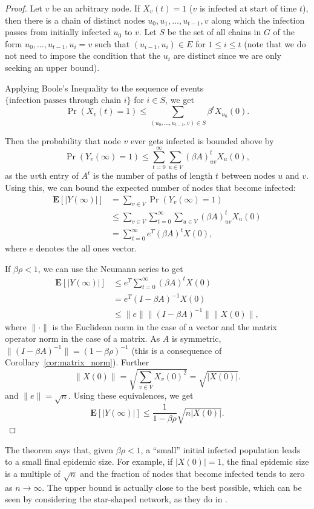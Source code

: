 \documentclass[11pt]{article}
\begin{document}
\begin{proof}
Let $v$ be an arbitrary node. If $X_v(t)=1$ ($v$ is infected at start of time $t$), then there is a chain of distinct nodes $u_0,u_1,\ldots,u_{t-1},v$ along which the infection passes from initially infected $u_0$ to $v$. Let $S$ be the set of all chains in $G$ of the form $u_0, \ldots, u_{t-1},u_i=v$ such that $(u_{i-1},u_i)\in E$ for $1\leq i\leq t$ (note that we do not need to impose the condition that the $u_i$ are distinct since we are only seeking an upper bound).

Applying Boole's Inequality to the sequence of events $\{\text{infection passes through chain } i\}$ for $i\in S$, we get
$$\Pr(X_v(t) = 1) \leq \sum_{(u_0,\ldots,u_{t-1},v)\in S} \beta^t X_{u_0}(0).$$

Then the probability that node $v$ ever gets infected is bounded above by
$$\Pr(Y_v(\infty) = 1) \leq \sum_{t=0}^\infty \sum_{u\in V} (\beta A)^t_{uv} X_u(0),$$
as the $uv$th entry of $A^t$ is the number of paths of length $t$ between nodes $u$ and $v$. Using this, we can bound the expected number of nodes that become infected:
$$\begin{aligned}
\mathbf{E}[|Y(\infty)|] &= \sum_{v\in V} \Pr(Y_v(\infty)=1) \\
	&\leq \sum_{v\in V} \sum_{t=0}^\infty \sum_{u\in V} (\beta A)^t_{uv} X_u(0) \\
	&= \sum_{t=0}^\infty e^T (\beta A)^t X(0),
\end{aligned}$$
where $e$ denotes the all ones vector.

If $\beta \rho <1$, we can use the Neumann series to get
$$\begin{aligned}
\mathbf{E}[|Y(\infty)|] &\leq e^T \sum_{t=0}^\infty(\beta A)^t X(0) \\
	&= e^T (I-\beta A)^{-1} X(0) \\
	&\leq \|e\| \|(I-\beta A)^{-1}\| \|X(0)\|,
\end{aligned}$$
where $\| \cdot \|$ is the Euclidean norm in the case of a vector and the matrix operator norm in the case of a matrix. As $A$ is symmetric, $\|(I-\beta A)^{-1} \| = (1-\beta \rho)^{-1}$ (this is a consequence of Corollary~\ref{cor:matrix_norm}). Further
$$\|X(0)\| = \sqrt{ \sum_{v\in V} X_v(0)^2} = \sqrt{|X(0)|}.$$
and $\| e\| = \sqrt{n}$. Using these equivalences, we get
$$\mathbf{E}[|Y(\infty)|] \leq \frac{1}{1-\beta \rho} \sqrt{n |X(0)|}.$$
\end{proof}

The theorem says that, given $\beta \rho < 1$, a ``small'' initial infected population leads to a small final epidemic size. For example, if $|X(0)|=1$, the final epidemic size is a multiple of $\sqrt{n}$ and the fraction of nodes that become infected tends to zero as $n\rightarrow \infty$. The upper bound is actually close to the best possible, which can be seen by considering the star-shaped network, as they do in \cite{draief:epidemics}.
\end{document}
